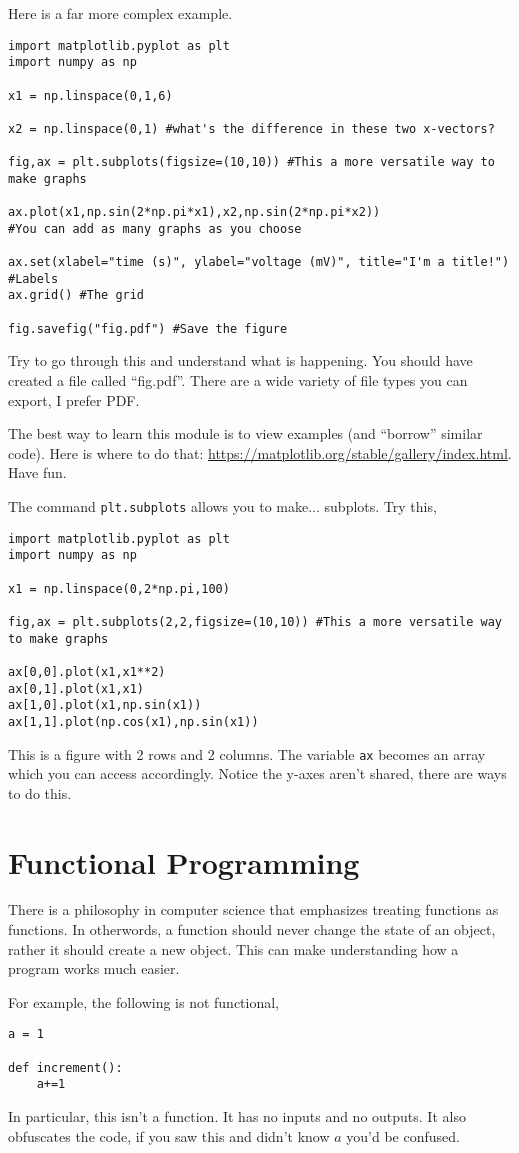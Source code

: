 \documentclass[11pt,letterpaper]{article}
\begin{document}
Here is a far more complex example.
\begin{verbatim}
import matplotlib.pyplot as plt
import numpy as np

x1 = np.linspace(0,1,6)

x2 = np.linspace(0,1) #what's the difference in these two x-vectors?

fig,ax = plt.subplots(figsize=(10,10)) #This a more versatile way to make graphs

ax.plot(x1,np.sin(2*np.pi*x1),x2,np.sin(2*np.pi*x2)) 
#You can add as many graphs as you choose

ax.set(xlabel="time (s)", ylabel="voltage (mV)", title="I'm a title!") #Labels
ax.grid() #The grid

fig.savefig("fig.pdf") #Save the figure
\end{verbatim}
Try to go through this and understand what is happening. You should have created a file called
``fig.pdf''. There are a wide variety of file types you can export, I prefer PDF.

The best way to learn this module is to view examples (and ``borrow'' similar code). Here is where
to do that: \url{https://matplotlib.org/stable/gallery/index.html}. Have fun.

The command \texttt{plt.subplots} allows you to make... subplots. Try this,
\begin{verbatim}
import matplotlib.pyplot as plt
import numpy as np

x1 = np.linspace(0,2*np.pi,100)

fig,ax = plt.subplots(2,2,figsize=(10,10)) #This a more versatile way to make graphs

ax[0,0].plot(x1,x1**2) 
ax[0,1].plot(x1,x1)
ax[1,0].plot(x1,np.sin(x1))
ax[1,1].plot(np.cos(x1),np.sin(x1))
\end{verbatim}
This is a figure with 2 rows and 2 columns. The variable \texttt{ax} becomes an array which you can access accordingly. Notice the y-axes aren't shared, there are ways to do this.


\section{Functional Programming}
There is a philosophy in computer science that emphasizes treating functions as functions. In otherwords,
a function should never change the state of an object, rather it should create a new object. This
can make understanding how a program works much easier. 

For example, the following is not functional,
\begin{verbatim}
a = 1

def increment():
    a+=1
\end{verbatim}
In particular, this isn't a function. It has no inputs and no outputs. It also obfuscates the code,
if you saw this and didn't know $a$ you'd be confused. 
\end{document}
